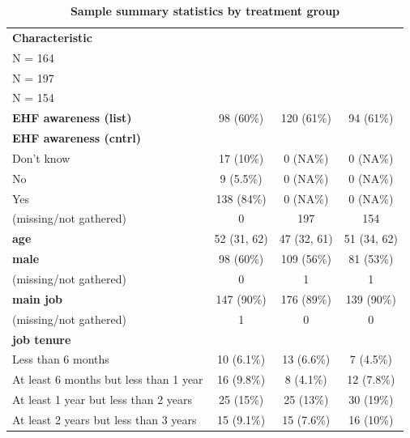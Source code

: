 \documentclass[
  11pt,
  oneside]{article}
\begin{document}
\begin{table}

\caption{\label{tab:tab-sum-uw}\textbf{Sample summary statistics by treatment group}}
\centering
\begin{tabular}[t]{l|c|c|c}
\hline
\textbf{Characteristic} & \makecell[c]{\textbf{cntrl}\ \ \\N = 164} & \makecell[c]{\textbf{txt}\ \ \\N = 197} & \makecell[c]{\textbf{vid}\ \ \\N = 154}\\
\hline
\textbf{EHF awareness (list)} & 98 (60\%) & 120 (61\%) & 94 (61\%)\\
\hline
\textbf{EHF awareness (cntrl)} &  &  & \\
\hline
\hspace{1em}Don’t know & 17 (10\%) & 0 (NA\%) & 0 (NA\%)\\
\hline
\hspace{1em}No & 9 (5.5\%) & 0 (NA\%) & 0 (NA\%)\\
\hline
\hspace{1em}Yes & 138 (84\%) & 0 (NA\%) & 0 (NA\%)\\
\hline
\hspace{1em}(missing/not gathered) & 0 & 197 & 154\\
\hline
\textbf{age} & 52 (31, 62) & 47 (32, 61) & 51 (34, 62)\\
\hline
\textbf{male} & 98 (60\%) & 109 (56\%) & 81 (53\%)\\
\hline
\hspace{1em}(missing/not gathered) & 0 & 1 & 1\\
\hline
\textbf{main job} & 147 (90\%) & 176 (89\%) & 139 (90\%)\\
\hline
\hspace{1em}(missing/not gathered) & 1 & 0 & \vphantom{1} 0\\
\hline
\textbf{job tenure} &  &  & \\
\hline
\hspace{1em}Less than 6 months & 10 (6.1\%) & 13 (6.6\%) & 7 (4.5\%)\\
\hline
\hspace{1em}At least 6 months but less than 1 year & 16 (9.8\%) & 8 (4.1\%) & 12 (7.8\%)\\
\hline
\hspace{1em}At least 1 year but less than 2 years & 25 (15\%) & 25 (13\%) & 30 (19\%)\\
\hline
\hspace{1em}At least 2 years but less than 3 years & 15 (9.1\%) & 15 (7.6\%) & 16 (10\%)\\

\end{tabular}
\end{table}
\end{document}
